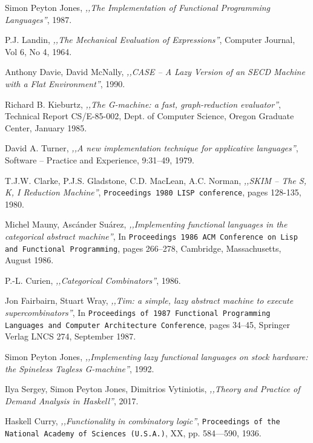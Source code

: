 \documentclass[en]{pracamgr}
\begin{document}
\begin{thebibliography}{99}
 Simon Peyton Jones, \textit{,,The Implementation of Functional Programming Languages''}, 1987.

 P.J. Landin, \textit{,,The Mechanical Evaluation of Expressions''}, Computer Journal, Vol 6, No 4, 1964.

 Anthony Davie, David McNally, \textit{,,CASE -- A Lazy Version of an SECD Machine with a Flat Environment''}, 1990.

 Richard B. Kieburtz, \textit{,,The G-machine: a fast, graph-reduction evaluator''}, Technical Report CS/E-85-002, Dept. of Computer Science, Oregon Graduate Center, January 1985.

 David A. Turner, \textit{,,A new implementation technique for applicative languages''}, Software -- Practice and Experience, 9:31–49, 1979.

 T.J.W. Clarke, P.J.S. Gladstone, C.D. MacLean, A.C. Norman, \textit{,,SKIM -- The S, K, I Reduction Machine''}, \texttt{Proceedings 1980 LISP conference}, pages 128-135, 1980.

 Michel Mauny, Asc\'ander Su\'arez, \textit{,,Implementing functional languages in the categorical abstract machine''}, In \texttt{Proceedings 1986 ACM Conference on Lisp and Functional Programming}, pages 266–278, Cambridge, Massachusetts, August 1986.

 P.-L. Curien, \textit{,,Categorical Combinators''}, 1986.

 Jon Fairbairn, Stuart Wray, \textit{,,Tim: a simple, lazy abstract machine to execute supercombinators''},  In \texttt{Proceedings of 1987 Functional Programming Languages and Computer Architecture Conference}, pages 34–45, Springer Verlag LNCS 274, September 1987.

 Simon Peyton Jones, \textit{,,Implementing lazy functional languages on stock hardware: the Spineless Tagless G-machine''}, 1992.

 Ilya Sergey, Simon Peyton Jones, Dimitrios Vytiniotis, \textit{,,Theory and Practice of Demand Analysis in Haskell''}, 2017.

 Haskell Curry, \textit{,,Functionality in combinatory logic''}, \texttt{Proceedings
of the National Academy of Sciences (U.S.A.)}, XX, pp. 584—590, 1936.


\end{thebibliography}
\end{document}
